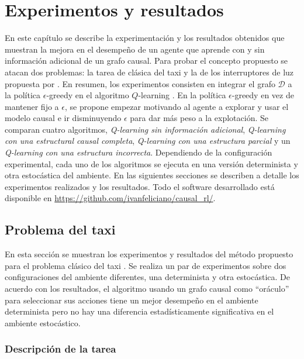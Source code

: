 \chapter{Experimentos y resultados}\label{chapter5}

\graphicspath{{Chapter5/Figs/}}


En este capítulo se describe la experimentación y los resultados obtenidos
que muestran la mejora en el desempeño de un agente que aprende
con y sin información adicional de un grafo causal.
Para probar el concepto propuesto se atacan dos problemas: la tarea de clásica del taxi \cite{Dietterich:2000:HRL:1622262.1622268} y la de los
interruptores de luz propuesta por \cite{nair2019causal}.
En resumen, los experimentos consisten en integrar el grafo $\mathcal{D}$ a la política $\epsilon$-greedy
en el algoritmo $Q$-learning \cite{watkins1992q}.
En la política $\epsilon$-greedy en vez de mantener fijo a $\epsilon$, se propone empezar motivando al agente a explorar y usar
el modelo causal e ir disminuyendo $\epsilon$ para dar más peso a la explotación.
Se comparan cuatro algoritmos, \textit{Q-learning sin información
adicional}, \textit{Q-learning con una estructural causal completa}, \textit{Q-learning con una estructura parcial} y un \textit{Q-learning con una estructura incorrecta}.
Dependiendo de la configuración experimental, cada uno de los algoritmos se ejecuta en una versión determinista y otra estocástica del ambiente. 
En las siguientes secciones se describen a detalle los experimentos realizados y los resultados. Todo el software desarrollado está 
disponible en \url{https://github.com/ivanfeliciano/causal_rl/}.


\section{Problema del taxi}

En esta sección se muestran los experimentos y resultados del método propuesto para el problema clásico del taxi \cite{Dietterich:2000:HRL:1622262.1622268}.
Se realiza un par de experimentos sobre dos configuraciones del ambiente diferentes,
una determinista y otra estocástica. De acuerdo con los resultados, 
el algoritmo usando un grafo causal como ``oráculo'' para seleccionar sus acciones
tiene un mejor desempeño en el ambiente determinista pero no hay una diferencia estadísticamente significativa en el ambiente estocástico.

\subsection{Descripción de la tarea}

